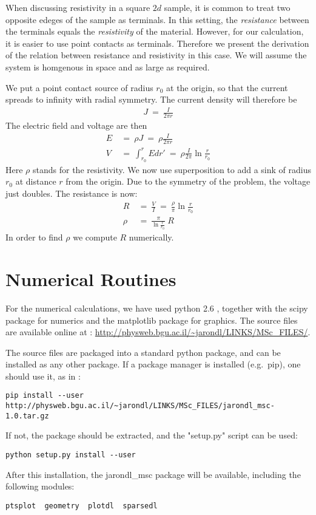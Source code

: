 When discussing resistivity in a square $2d$ sample, it is common
to treat two opposite edeges of the sample as terminals.
In this setting, the \emph{resistance} between the terminals equals the
\emph{resistivity} of the material. However, for our calculation,
it is easier to use point contacts as terminals. Therefore we present the
derivation of the relation between resistance and resistivity in this case.
We will assume the system is homgenous in space and as large as required.


We put a point contact source of radius $r_0$ at the origin, so 
that the current spreads to infinity with radial symmetry. The current 
density will therefore be
%
\begin{align}
J\ =\ \frac{I}{2\pi r}
\end{align}
%
The electric field and voltage are then
%
\begin{align}
E \ &=\ \rho J\ =\ \rho \frac{I}{2\pi r } \\
V \ &=\ \int_{r_0}^r E dr' \ =\ \rho\frac{I}{2\pi}\ln \frac{r}{r_0}
\end{align}
%
Here $\rho$ stands for the resistivity. We now use superposition to add a sink of radius $r_0$ at distance $r$ 
from the origin. Due to the symmetry of the problem, the voltage just doubles. The resistance is now:
%
\begin{align}
R \ &=\ \frac{V}{I}\ =\ \frac{\rho}{\pi} \ln\frac{r}{r_0} \\
\rho \ &= \ \frac{\pi}{\ln\frac{r}{r_0}} \ R
\end{align}
%
In order to find $\rho$ we compute $R$ numerically.


\chapter{Numerical Routines}

For the numerical calculations, we have used python 2.6 \cite{guido_van_rossum_python_????}, together
with the scipy \cite{jones_scipy:_2001} package for numerics and the matplotlib \cite{hunter_matplotlib:_2007} package
for graphics. The source files are available online at : 
\url{http://physweb.bgu.ac.il/~jarondl/LINKS/MSc_FILES/}.


The source files are packaged into a standard python package,
and can be installed as any other package. If a package manager is installed (e.g.\ pip),
one should use it, as in :
\begin{verbatim}
pip install --user http://physweb.bgu.ac.il/~jarondl/LINKS/MSc_FILES/jarondl_msc-1.0.tar.gz
\end{verbatim}
If not, the package should be extracted, and the "setup.py" script can be used:
\begin{verbatim}
python setup.py install --user
\end{verbatim}
After this installation, the jarondl\_msc package will be available,
including the following modules:
\begin{verbatim}
ptsplot  geometry  plotdl  sparsedl
\end{verbatim}

